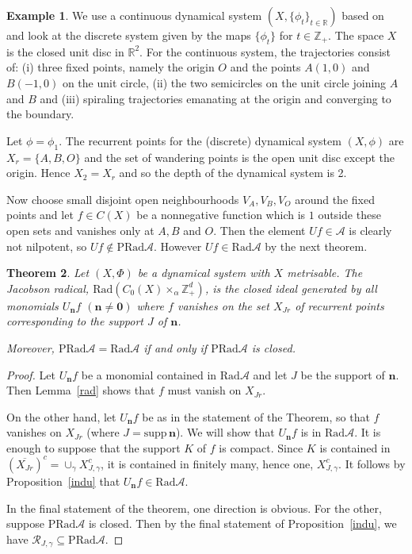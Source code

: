 \documentclass[12pt]{amsart}
\newtheorem{theorem}{Theorem}
\theoremstyle{definition}
\newtheorem{example}[theorem]{Example}
\newcommand{\mcA}{\mathcal{A}}
\newcommand{\mcR}{\mathcal{R}}
\newcommand{\bbR}{\mathbb{R}}
\newcommand{\bbZ}{\mathbb{Z}}
\newcommand{\rad}{\mathrm{Rad}}
\newcommand{\prad}{\mathrm{PRad}}
\newcommand{\bo}[1]{\mathbf{#1}}
\newcommand{\bon}{\mathbf{n}}
\begin{document}
\begin{example}
We use a continuous dynamical system $(X,\{\phi_{t}\}_{t \in
\bbR})$ based on~\cite[Example~3.3.4, p.~20]{BhSz} and look at the
discrete system given by the maps $\{\phi_t\}$ for $t \in \bbZ_+$.
The space $X$ is the closed unit disc in $\mathbb{R}^{2}$. For the
continuous system, the trajectories consist of: (i) three fixed
points, namely the origin $O$ and the points $A(1,0)$ and
$B(-1,0)$ on the unit circle, (ii) the two semicircles on the unit
circle joining $A$ and $B$ and (iii) spiraling trajectories
emanating at the origin and converging to the boundary.

Let $\phi =\phi_1$.
The recurrent points for the (discrete) dynamical system $(X,\phi)$ are
$X_{r}=\{A,B,O\}$ and the set of wandering points is the open unit disc
except the origin.
Hence $X_2=X_{r}$ and so the depth of the dynamical system is 2.

Now choose small disjoint open neighbourhoods $V_A,V_B,V_O$ around
the fixed points and let $f\in C(X)$ be a nonnegative function
which is $1$ outside these open sets and vanishes only at $A,B$ and $O$.
Then the element $Uf\in \mcA$ is clearly not nilpotent, so
$Uf\notin \prad\mcA$.
However $Uf\in \rad\mcA$ by the next theorem.
\end{example}

\begin{theorem} \label{fulrad2}
Let  $(X,\Phi)$ be a dynamical system with $X$ metrisable.
The Jacobson radical, $\rad(C_{0}(X)\times _{\alpha }\bbZ_+^d)$, is the
closed ideal generated by all monomials $U_{\bon}f$ $(\bo{n \ne 0})$
where $f$ vanishes on the set $X_{Jr}$ of recurrent points corresponding
to the support $J$ of $\bon$.

Moreover, $\prad\mcA = \rad\mcA$ if and only if $\prad\mcA$ is closed.
\end{theorem}

\begin{proof}
Let $U_{\bon}f$ be a monomial contained in $\rad\mcA$ and
let $J$ be the support of $\bon$. Then Lemma~\ref{rad} shows
that $f$ must vanish on $X_{Jr}$.

On the other hand, let $U_{\bon}f$ be as in the statement of the
Theorem, so that $f$ vanishes on $X_{Jr}$ (where
$J = \mathrm{supp}\,\bon$).
We will show that $U_{\bon}f$ is in $\rad\mcA$.
It is enough to suppose that the support $K$ of $f$ is compact.
Since $K$ is contained in
$(\overline{X_{Jr}})^c=\cup _{\gamma }X_{J,\gamma }^c$,
it is contained in finitely many, hence one,
$X_{J,\gamma }^{c}$. It follows by Proposition~\ref{indu} that
$U_{\bon}f\in \rad\mcA$.

In the final statement of the theorem, one direction is obvious.
For the other, suppose $\prad\mcA$ is closed.
Then by the final statement of Proposition~\ref{indu}, we have
$\mcR_{J,\gamma} \subseteq \prad\mcA$.
\end{proof}
\end{document}
